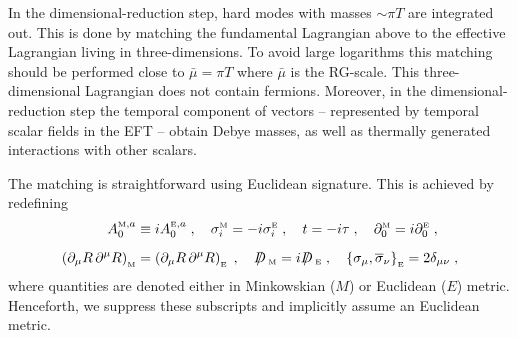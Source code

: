 \documentclass[11pt]{article}
\newcommand{\bmu}{\bar\mu}
\newcommand{\rmii}[1]{{\mbox{\tiny\rm{#1}}}}
\newcommand{\bsl}[1]{\,\slash\!\!\!\!{#1}\,}
\newcommand*\ol[1]{\overline{#1}}
\begin{document}
In the dimensional-reduction step, hard modes with masses $\sim \pi T$
are integrated out.
This is done by matching
the fundamental Lagrangian above to
the effective Lagrangian living in three-dimensions. 
To avoid large logarithms this matching should be performed close to
$\bmu=\pi T$
where $\bmu$ is the RG-scale.
This three-dimensional Lagrangian does not contain fermions.
Moreover, in the dimensional-reduction step the temporal component of vectors -- represented by temporal scalar fields in the EFT -- obtain Debye masses, as well as thermally generated interactions with other scalars.

The matching is straightforward using Euclidean signature.
This is achieved by redefining
\begin{align}
  A^{\rmii{M},a}_0 &\equiv i A^{\rmii{E},a}_0
  \;, \quad
  \sigma_i^{\rmii{M}}=-i \sigma_i^{\rmii{E}}
  \;, \quad
  t=-i \tau
  \;, \quad
  \partial_0^{\rmii{M}}=i \partial_0^{\rmii{E}}
  \;,
  \\[2mm]
  \left(\partial_\mu R \,\partial^\mu R\right)_{\rmii{M}} &=
  \left(\partial_\mu R \, \partial^\mu R\right)_{\rmii{E}}
  \;, \quad
  \bsl{D}_{\rmii{M}}=i \bsl{D}_{\rmii{E}}
  \;, \quad
  \left\{\sigma_\mu,\ol{\sigma}_\nu \right\}_{\rmii{E}} =
  2 \delta_{\mu \nu}
  \;,
\end{align}
where quantities are denoted either in
Minkowskian ($M$) or
Euclidean ($E$) metric. Henceforth,
we suppress these subscripts and implicitly assume an Euclidean metric.
\end{document}
